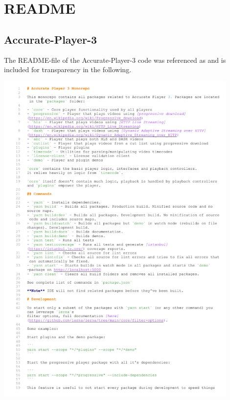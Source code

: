 \documentclass[12pt,a4paper]{article}
\begin{document}
	
	
	
	\newpage
	\begin{spacing}{1}
		\printbibliography[notcategory=skipbibliography]
	\end{spacing}
	
	
	
	
	
\newpage
\listoffigures



\newpage
\listoftables	
	
	

\appendix

\newpage

\section{README} \label{appendix:readme}


\subsection{Accurate-Player-3} \label{appendix:readmeaccurateplayer}

The README-file of the Accurate-Player-3 code was referenced as \cite{RM_Frontend} and is included for transparency in the following.

\includegraphics[page=1, width=0.9\textwidth]{FE.pdf}
\end{document}
